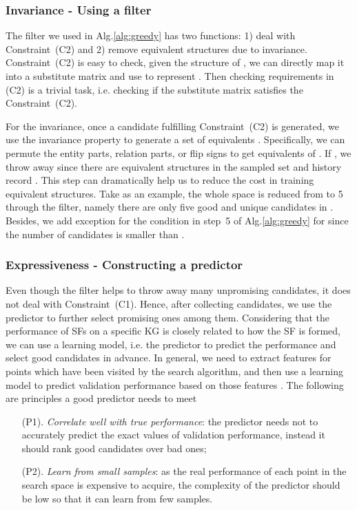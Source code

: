 \documentclass[conference]{IEEEtran}
\begin{document}
\subsubsection{Invariance - Using a filter}
\label{ssec:filter}

The filter  we used in Alg.\ref{alg:greedy} has two functions:
1) deal with Constraint~(C2) 
and 2) remove equivalent structures due to invariance.
Constraint~(C2) is easy to check,
given the structure of ,
we can directly map it into a  substitute matrix 
and use 
to represent 
.
Then checking requirements in (C2) is a trivial task,
i.e.  checking if the  substitute matrix 
satisfies the Constraint~(C2).

For the invariance,
once a candidate  fulfilling Constraint~(C2) is generated, we use the invariance property to generate a set of equivalents .
Specifically,
we can permute the entity parts, relation parts,
or flip signs
to get  equivalents of .
If 
,
we throw  away since there are equivalent structures in the sampled set 
and history record .
This step can dramatically help us to reduce the cost in training equivalent structures.
Take  as an example, the whole space is reduced from  to 5 through the filter,
namely there are only five good and unique candidates in .
Besides, we add exception for the condition in step~5  of Alg.\ref{alg:greedy} for  
since the number of candidates is smaller than .




\subsubsection{Expressiveness - Constructing a predictor}
\label{ssec:pred}

Even though the filter helps to throw away many unpromising candidates, 
it does not deal with Constraint~(C1).
Hence, after collecting  candidates, 
we use the predictor  to further select  promising ones among them.
Considering that the performance of SFs on a specific KG is closely related to how the SF is formed,
we can use a learning model, i.e. the predictor  
to predict the performance and select good candidates in advance.
In general,
we need to extract features for points 
which have been visited by the search algorithm,
and then use a learning model to predict validation performance based on those features \cite{feurer2015efficient,liu2018progressive}.
The following are principles
a good predictor needs to meet
\begin{itemize}[leftmargin=26px]
	\vspace{-1px}
	\item[(P1).] 
	\textit{Correlate well with true performance}:
	the predictor needs not to accurately predict the exact values of validation performance,
	instead it should rank good candidates over bad ones;
	
	\item[(P2).] 
	\textit{Learn from small samples}:
	as the real performance of each point in the search space is expensive to acquire,
	the complexity of the predictor should be low so that it can learn from few samples. 
	\vspace{-1px}
\end{itemize}
\end{document}
